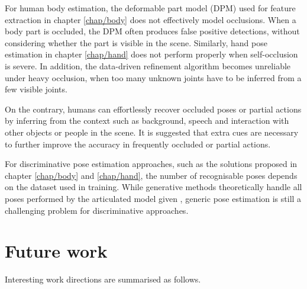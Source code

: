 For human body estimation, the deformable part model (DPM) used for feature extraction in chapter \ref{chap/body} does not effectively model occlusions. When a body part is occluded, the DPM often produces false positive detections, without considering whether the part is visible in the scene. Similarly, hand pose estimation in chapter \ref{chap/hand} does not perform properly when self-occlusion is severe. In addition, the data-driven refinement algorithm becomes unreliable under heavy occlusion, when too many unknown joints have to be inferred from a few visible joints. 

On the contrary, humans can effortlessly recover occluded poses or partial actions by inferring from the context such as background, speech and interaction with other objects or people in the scene. It is suggested that extra cues are necessary to further improve the accuracy in frequently occluded or partial actions. 

For discriminative pose estimation approaches, such as the solutions proposed in chapter \ref{chap/body} and \ref{chap/hand}, the number of recognisable poses depends on the dataset used in training. While generative methods theoretically handle all poses performed by the articulated model given \cite{Oikonomidis2011}, generic pose estimation is still a challenging problem for discriminative approaches. 

\section{Future work}

Interesting work directions are summarised as follows.

